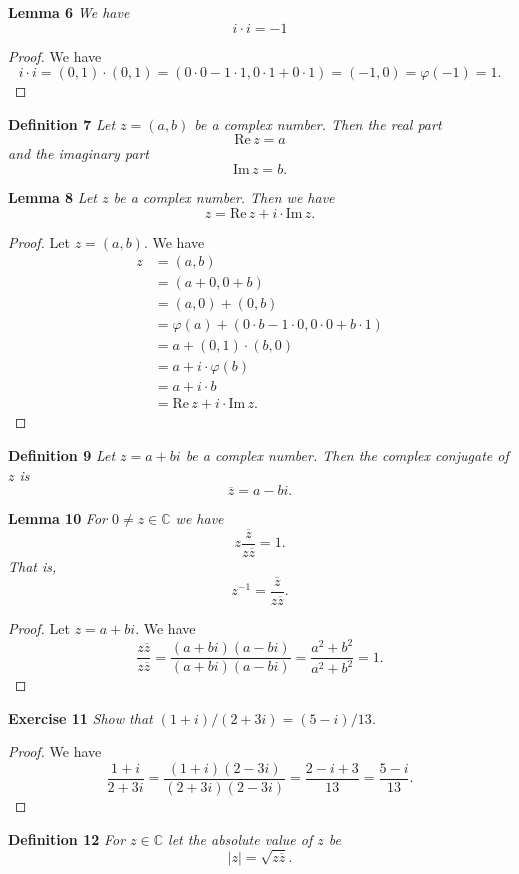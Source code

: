 \documentclass{article}
\begin{document}
\begin{flushleft}
\textbf{Lemma 6}
\textsl{We have
\[
i \cdot i = -1
\]}
\begin{proof}
We have
\[
i \cdot i = (0,1) \cdot (0,1) = (0\cdot 0 - 1 \cdot 1, 0 \cdot 1 + 0 \cdot 1) = (-1,0) = \varphi (-1) = 1.
\]
\end{proof}

\textbf{Definition 7}
\textsl{Let $z = (a,b)$ be a complex number. Then the real part
\[
\text{Re} \, z = a
\]
and the imaginary part
\[
\text{Im} \, z = b.
\]}\newline

\textbf{Lemma 8}
\textsl{Let $z$ be a complex number. Then we have
\[
z = \text{Re} \, z + i \cdot \text{Im} \, z.
\]}
\begin{proof}
Let $z = (a,b)$. We have
\begin{align*}
z &= (a,b) \\
  &= (a+0,0+b) \\
  & = (a,0) + (0,b) \\
  &= \varphi (a) + (0 \cdot b - 1 \cdot 0, 0 \cdot 0 + b \cdot 1) \\
  &= a + (0,1) \cdot (b,0) \\
  &= a + i \cdot \varphi (b) \\
  & = a + i \cdot b \\
  & = \text{Re} \, z + i \cdot \text{Im} \, z.
\end{align*}
\end{proof}

\textbf{Definition 9}
\textsl{Let $z = a + bi$ be a complex number. Then the complex conjugate of $z$ is
\[
\overline{z} = a - bi.
\]}\newline

\textbf{Lemma 10}
\textsl{For $0 \neq z \in \mathbb{C}$ we have
\[
z \frac{\overline{z}}{z \overline{z}} = 1.
\]
That is,
\[
z^{-1} = \frac{\overline{z}}{z \overline{z}}.
\]}
\begin{proof}
Let $z = a+bi$. We have
\[
\frac{z \overline{z}}{z \overline{z}} = \frac{(a+bi)(a-bi)}{(a+bi)(a-bi)} = \frac{a^2+b^2}{a^2+b^2} = 1.
\]
\end{proof}

\textbf{Exercise 11}
\textsl{Show that $(1+i)/(2+3i) = (5-i)/13$.}
\begin{proof}
We have
\[
\frac{1+i}{2+3i} = \frac{(1+i)(2-3i)}{(2+3i)(2-3i)} = \frac{2-i+3}{13} = \frac{5-i}{13}.
\]
\end{proof}

\textbf{Definition 12}
\textsl{For $z \in \mathbb{C}$ let the absolute value of $z$ be
\[
|z| = \sqrt{z \overline{z}}.
\]}\newline


\end{flushleft}
\end{document}
